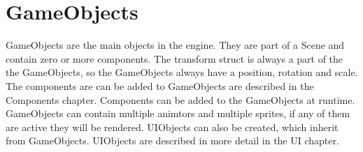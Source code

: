 \section{GameObjects}
GameObjects are the main objects in the engine. They are part of a Scene and contain zero or more components.
The transform struct is always a part of the the GameObjects, so the GameObjects always have a position, rotation and scale.
The components are can be added to GameObjects are described in the Components chapter.
Components can be added to the GameObjects at runtime.
GameObjects can contain multiple animtors and multiple sprites, if any of them are active they will be rendered.
UIObjects can also be created, which inherit from GameObjects. UIObjects are described in more detail in the UI chapter.